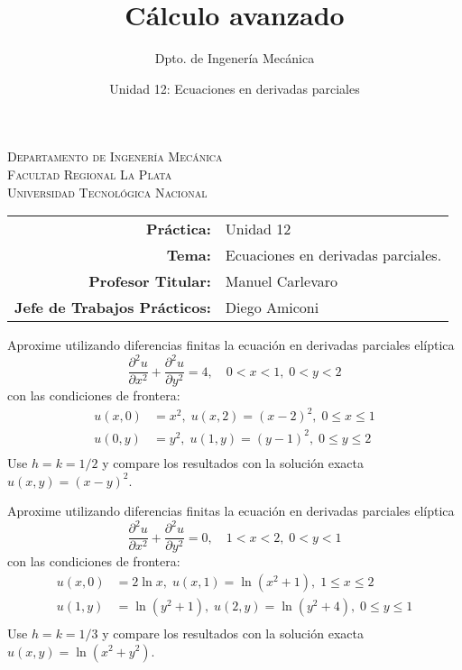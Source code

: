 \documentclass[11pt]{article}
\title{Cálculo avanzado}
\author{Dpto. de Ingenería Mecánica}
\date{Unidad 12: Ecuaciones en derivadas parciales}
\begin{document}

\begin{center}
\end{center} 

\begin{center}
\vspace{\baselineskip}
\Large{\textsc{Departamento de Ingenería Mecánica}} \\
\textsc{Facultad Regional La Plata} \\
\textsc{Universidad Tecnológica Nacional}
\end{center}


\begin{center}
\begin{tabular}{r l}
    \textbf{Práctica:} & Unidad 12 \\
 \textbf{Tema:} & Ecuaciones en derivadas parciales. \\
 \textbf{Profesor Titular:} & Manuel Carlevaro \\
 \textbf{Jefe de Trabajos Prácticos:} & Diego Amiconi \\
\end{tabular}\end{center}

\vspace{1em}

\begin{question} %
Aproxime utilizando diferencias finitas la ecuación en derivadas parciales elíptica
\[ \frac{\partial^2 u}{\partial x^2} +  \frac{\partial^2 u}{\partial y^2} = 4, \quad 0 < x < 1, \; 0 < y < 2 \]
con las condiciones de frontera:
\begin{align*}
    u(x, 0) &= x^2,\; u(x, 2) = (x - 2)^2,\; 0 \leq x \leq 1 \\
    u(0, y) &= y^2,\; u(1, y) = (y - 1)^2,\; 0 \leq y \leq 2 \\
\end{align*}
Use $h = k = 1/2$ y compare los resultados con la solución exacta $u(x, y) = (x - y)^2$.
\end{question}

\begin{question} %
Aproxime utilizando diferencias finitas la ecuación en derivadas parciales elíptica
\[ \frac{\partial^2 u}{\partial x^2} +  \frac{\partial^2 u}{\partial y^2} = 0, \quad 1 < x < 2, \; 0 < y < 1 \]
con las condiciones de frontera:
\begin{align*}
    u(x, 0) &= 2 \ln x,\; u(x, 1) = \ln(x^2 + 1),\; 1 \leq x \leq 2 \\
    u(1, y) &= \ln(y^2 + 1),\; u(2, y) = \ln(y^2 + 4),\; 0 \leq y \leq 1 \\
\end{align*}
Use $h = k = 1/3$ y compare los resultados con la solución exacta $u(x, y) = \ln(x^2 + y^2)$.
\end{question}
\end{document}
